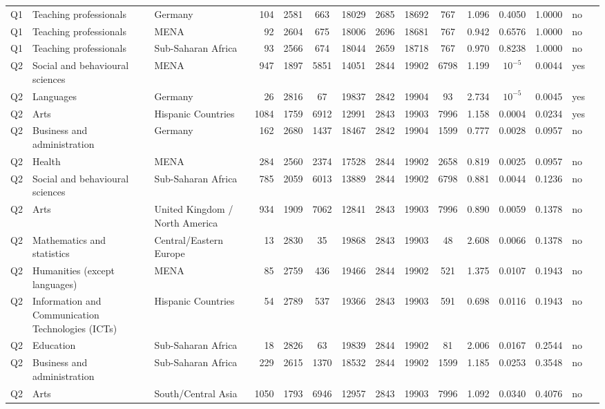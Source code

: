 \begin{longtable}{lllrcccccccccll}
Q1 & Teaching professionals & Germany & 104 & 2581 & 663 & 18029 & 2685 & 18692 & 767 & 1.096 & 0.4050 & 1.0000 & no \\
Q1 & Teaching professionals & MENA & 92 & 2604 & 675 & 18006 & 2696 & 18681 & 767 & 0.942 & 0.6576 & 1.0000 & no \\
Q1 & Teaching professionals & Sub-Saharan Africa & 93 & 2566 & 674 & 18044 & 2659 & 18718 & 767 & 0.970 & 0.8238 & 1.0000 & no \\
Q2 & Social and behavioural sciences & MENA & 947 & 1897 & 5851 & 14051 & 2844 & 19902 & 6798 & 1.199 & $10^{-5}$ & 0.0044 & yes \\
Q2 & Languages & Germany & 26 & 2816 & 67 & 19837 & 2842 & 19904 & 93 & 2.734 & $10^{-5}$ & 0.0045 & yes \\
Q2 & Arts & Hispanic Countries & 1084 & 1759 & 6912 & 12991 & 2843 & 19903 & 7996 & 1.158 & 0.0004 & 0.0234 & yes \\
Q2 & Business and administration & Germany & 162 & 2680 & 1437 & 18467 & 2842 & 19904 & 1599 & 0.777 & 0.0028 & 0.0957 & no \\
Q2 & Health & MENA & 284 & 2560 & 2374 & 17528 & 2844 & 19902 & 2658 & 0.819 & 0.0025 & 0.0957 & no \\
Q2 & Social and behavioural sciences & Sub-Saharan Africa & 785 & 2059 & 6013 & 13889 & 2844 & 19902 & 6798 & 0.881 & 0.0044 & 0.1236 & no \\
Q2 & Arts & United Kingdom / North America & 934 & 1909 & 7062 & 12841 & 2843 & 19903 & 7996 & 0.890 & 0.0059 & 0.1378 & no \\
Q2 & Mathematics and statistics & Central/Eastern Europe & 13 & 2830 & 35 & 19868 & 2843 & 19903 & 48 & 2.608 & 0.0066 & 0.1378 & no \\
Q2 & Humanities (except languages) & MENA & 85 & 2759 & 436 & 19466 & 2844 & 19902 & 521 & 1.375 & 0.0107 & 0.1943 & no \\
Q2 & Information and Communication Technologies (ICTs) & Hispanic Countries & 54 & 2789 & 537 & 19366 & 2843 & 19903 & 591 & 0.698 & 0.0116 & 0.1943 & no \\
Q2 & Education & Sub-Saharan Africa & 18 & 2826 & 63 & 19839 & 2844 & 19902 & 81 & 2.006 & 0.0167 & 0.2544 & no \\
Q2 & Business and administration & Sub-Saharan Africa & 229 & 2615 & 1370 & 18532 & 2844 & 19902 & 1599 & 1.185 & 0.0253 & 0.3548 & no \\
Q2 & Arts & South/Central Asia & 1050 & 1793 & 6946 & 12957 & 2843 & 19903 & 7996 & 1.092 & 0.0340 & 0.4076 & no \\

\end{longtable}
